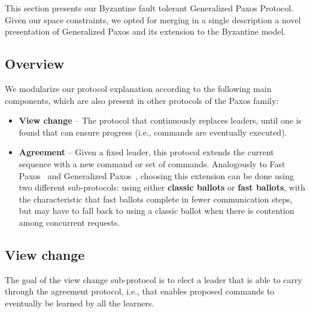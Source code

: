 This section presents our Byzantine fault tolerant Generalized Paxos
Protocol. Given our space constraints, we opted for merging in a
single description a novel presentation of Generalized Paxos and its
extension to the Byzantine model.
\subsection{Overview}

We modularize our protocol explanation according to the following main components, which are also present in other protocols of the Paxos family:

\begin{itemize}

\item
{\bf View change} -- The protocol that continuously replaces leaders, until one is found that can ensure progress (i.e., commands are eventually executed).

\item
{\bf Agreement} -- Given a fixed leader, this protocol extends the current sequence with a new command or set of commands. Analogously to Fast Paxos~\cite{L06} and Generalized Paxos~\cite{Lamport2005}, choosing this extension can be done using two different sub-protocols: using either {\bf classic ballots} or {\bf fast ballots}, with the characteristic that fast ballots complete in fewer communication steps, but may have to fall back to using a classic ballot when there is contention among concurrent requests.

\end{itemize}

\subsection{View change} 

The goal of the view change sub-protocol is to elect a leader that is able to carry through the agreement protocol, i.e., that enables proposed commands to eventually be learned by all the learners.


